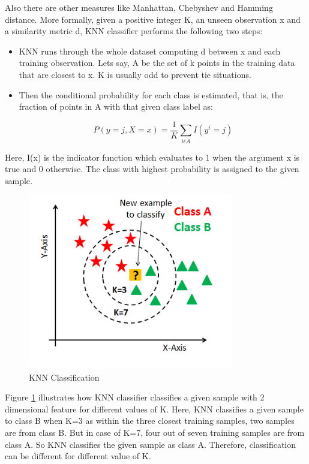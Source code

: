 \documentclass[12pt]{article}
\begin{document}
\noindent Also there are other measures like Manhattan, Chebyshev and Hamming distance. More formally, given a positive integer K, an unseen observation x and a similarity metric d, KNN classifier performs the following two steps:
\begin{itemize}
	\item KNN runs through the whole dataset computing d between x and each training observation. Lets say, A be the set of k points in the training data that are closest to x. K is usually odd to prevent tie situations.
	\item  Then the conditional probability for each class is estimated, that is, the fraction of points in A with that given class label as:
	
	\begin{equation}
	P(y=j,X=x)=\frac{1}{K}\sum_{i\epsilon A}^{}I(y^i=j)
	\end{equation}
\end{itemize}	
\noindent Here, I(x) is the indicator function which evaluates to 1 when the argument x is true and 0 otherwise. The class with highest probability is assigned to the given sample.
\begin{figure}[H]
	\begin{center}
		\centering
		\includegraphics[width=0.8\textwidth]{KNN.png}
		\caption{KNN Classification}
		\label{fig:KNN_Classification}
	\end{center}
\end{figure}
\noindent Figure \ref{fig:KNN_Classification} illustrates how KNN classifier classifies a given sample with 2 dimensional feature for different values of K. \noindent Here, KNN classifies a given sample to class B when K=3 as within the three closest training samples, two samples are from class B. But in case of K=7, four out of seven training samples are from class A. So KNN classifies the given sample as class A. Therefore, classification can be different for different value of K.
\end{document}

